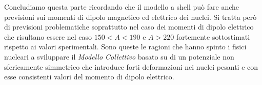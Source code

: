 Concludiamo questa parte ricordando che il modello a shell può fare anche previsioni sui momenti di dipolo magnetico ed elettrico dei nuclei.
Si tratta però di previsioni problematiche soprattutto nel caso dei momenti di dipolo elettrico che risultano essere nel caso $150<A<190$ e $A>220$ fortemente sottostimati rispetto ai valori sperimentali.
Sono queste le ragioni che hanno spinto i fisici nucleari a sviluppare il \emph{Modello Collettivo} basato su di un potenziale non sfericamente
simmetrico che introduce forti deformazioni nei nuclei pesanti e con esse consistenti valori del momento di dipolo elettrico.


















































